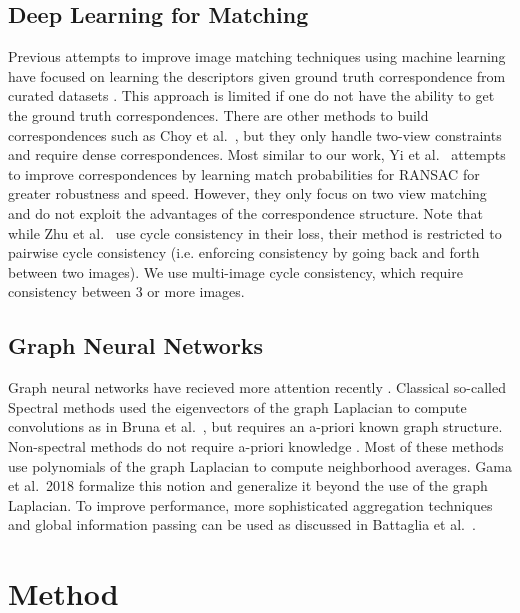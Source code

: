 \documentclass{article} %
\begin{document}
\subsection{Deep Learning for Matching}
Previous attempts to improve image matching techniques using machine learning have focused on learning the descriptors given ground truth correspondence from curated datasets \cite{zagoruyko2015learning, yi2016lift, brachmann2017dsac}.
This approach is limited if one do not have the ability to get the ground truth correspondences.
There are other methods to build correspondences such as Choy et al.~\cite{choy2016universal}, but they only handle two-view constraints and require dense correspondences.
Most similar to our work, Yi et al.~\cite{yi2018learning} attempts to improve correspondences by learning match probabilities for RANSAC for greater robustness and speed.
However, they only focus on two view matching and do not exploit the advantages of the correspondence structure.
Note that while Zhu et al.~\cite{zhu2017unpaired} use cycle consistency in their loss, their method is restricted to pairwise cycle consistency (i.e. enforcing consistency by going back and forth between two images).
We use multi-image cycle consistency, which require consistency between 3 or more images.

\subsection{Graph Neural Networks}
Graph neural networks have recieved more attention recently \cite{bronstein2017geometric, bruna2013spectral, defferrard2016convolutional, kipf2017semi, scarselli2009graph, gama2018mimo, gama2018convolutional, battaglia2018relational}.
Classical so-called Spectral methods used the eigenvectors of the graph Laplacian to compute convolutions as in Bruna et al.~\cite{bruna2013spectral}, but requires an a-priori known graph structure. 
Non-spectral methods do not require a-priori knowledge \cite{bronstein2017geometric, kipf2017semi, scarselli2009graph, gama2018convolutional}.
Most of these methods use polynomials of the graph Laplacian to compute neighborhood averages.
Gama et al.~2018 \cite{gama2018mimo, gama2018convolutional} formalize this notion and generalize it beyond the use of the graph Laplacian.
To improve performance, more sophisticated aggregation techniques and global information passing can be used as discussed in Battaglia et al.~\cite{battaglia2018relational}.

\section{Method}
\end{document}
